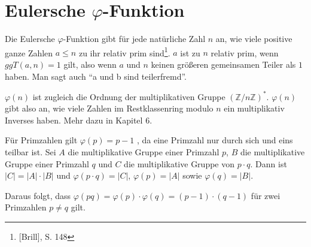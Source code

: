 \section{Eulersche $\varphi$-Funktion}
Die Eulersche $\varphi$-Funktion gibt für jede natürliche Zahl $n$ an, 
wie viele positive ganze Zahlen $a \leq n $ zu ihr relativ prim sind\footnote{[Brill], S. 148}.
$a$ ist zu $n$ relativ prim, wenn $ggT(a,n) = 1$ gilt, also wenn $a$ 
und $n$ keinen größeren gemeinsamen Teiler als $1$ haben. Man sagt 
auch "`a und b sind teilerfremd"'.

$\varphi(n)$ ist zugleich die Ordnung der multiplikativen Gruppe $(\mathbb{Z}/n \mathbb{Z})^*$. 
$\varphi(n)$ gibt also an, wie viele Zahlen im Restklassenring modulo $n$ ein multiplikativ Inverses haben. Mehr dazu in Kapitel 6.	%

Für Primzahlen gilt $\varphi(p) = p - 1$ , da eine Primzahl nur 
durch sich und eins teilbar ist. Sei $A$ die multiplikative Gruppe 
einer Primzahl $p$, $B$ die multiplikative Gruppe einer Primzahl $q$ 
und $C$ die multiplikative Gruppe von $p \cdot q$. Dann ist $|C| = |A| \cdot |B|$ und 
$\varphi(p \cdot q) = |C|$, $\varphi(p) = |A|$ sowie $\varphi(q) = |B|$.

Daraus folgt, dass $\varphi(pq) = \varphi(p) \cdot \varphi(q) = (p-1) \cdot (q - 1)$ für zwei Primzahlen $p \neq q$ gilt.
